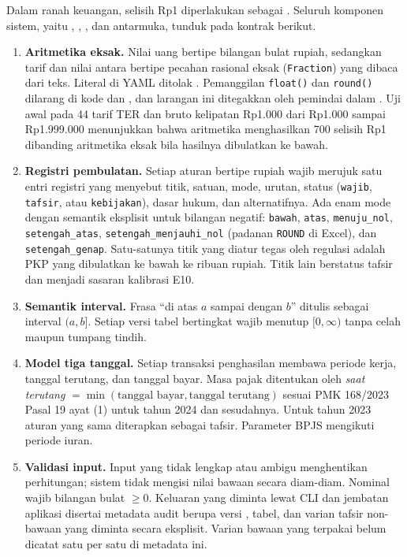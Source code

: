 Dalam ranah keuangan, selisih Rp1 diperlakukan sebagai . Seluruh komponen sistem, yaitu , , , dan antarmuka, tunduk pada kontrak berikut.
\begin{enumerate}[leftmargin=*,nosep]
  \item \textbf{Aritmetika eksak.} Nilai uang bertipe bilangan bulat rupiah, sedangkan tarif dan nilai antara bertipe pecahan rasional eksak (\texttt{Fraction}) yang dibaca dari teks. Literal  di YAML ditolak . Pemanggilan \texttt{float()} dan \texttt{round()} dilarang di kode  dan , dan larangan ini ditegakkan oleh pemindai  dalam . Uji awal pada 44 tarif TER dan bruto kelipatan Rp1.000 dari Rp1.000 sampai Rp1.999.000 menunjukkan bahwa aritmetika  menghasilkan 700 selisih Rp1 dibanding aritmetika eksak bila hasilnya dibulatkan ke bawah.
  \item \textbf{Registri pembulatan.} Setiap aturan bertipe rupiah wajib merujuk satu entri registri yang menyebut titik, satuan, mode, urutan, status (\texttt{wajib}, \texttt{tafsir}, atau \texttt{kebijakan}), dasar hukum, dan alternatifnya. Ada enam mode dengan semantik eksplisit untuk bilangan negatif: \texttt{bawah}, \texttt{atas}, \texttt{menuju\_nol}, \texttt{setengah\_atas}, \texttt{setengah\_menjauhi\_nol} (padanan \texttt{ROUND} di Excel), dan \texttt{setengah\_genap}. Satu-satunya titik yang diatur tegas oleh regulasi adalah PKP yang dibulatkan ke bawah ke ribuan rupiah. Titik lain berstatus tafsir dan menjadi sasaran kalibrasi E10.
  \item \textbf{Semantik interval.} Frasa ``di atas $a$ sampai dengan $b$'' ditulis sebagai interval $(a, b]$. Setiap versi tabel bertingkat wajib menutup $[0, \infty)$ tanpa celah maupun tumpang tindih.
  \item \textbf{Model tiga tanggal.} Setiap transaksi penghasilan membawa periode kerja, tanggal terutang, dan tanggal bayar. Masa pajak ditentukan oleh \emph{saat terutang} $=\min(\text{tanggal bayar}, \text{tanggal terutang})$ sesuai PMK 168/2023 Pasal 19 ayat (1) untuk tahun 2024 dan sesudahnya. Untuk tahun 2023 aturan yang sama diterapkan sebagai tafsir. Parameter BPJS mengikuti periode iuran.
  \item \textbf{Validasi input.} Input yang tidak lengkap atau ambigu menghentikan perhitungan; sistem tidak mengisi nilai bawaan secara diam-diam. Nominal wajib bilangan bulat $\ge 0$. Keluaran yang diminta lewat CLI dan jembatan aplikasi disertai metadata audit berupa versi ,  tabel, dan varian tafsir non-bawaan yang diminta secara eksplisit. Varian bawaan yang terpakai belum dicatat satu per satu di metadata ini.
\end{enumerate}

